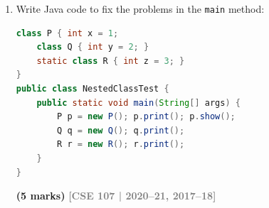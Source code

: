 \documentclass[12pt,a3paper]{article}
\newcommand{\yr}[1]{\hfill\textcolor{gray}{\small\textbf{[#1]}}}
\newcommand{\mk}[1]{\textcolor{orange!70!black}{\small\textbf{(#1 marks)}}}
\begin{document}
\begin{enumerate}
\begin{tcolorbox}[enhanced,breakable,ansbox,
  colback=cC!4,colframe=cC,boxrule=0.8pt,arc=5pt,
  title={\textbf{Answer --- Institute/College: equals and hashCode}},
  fonttitle=\bfseries\color{white},colbacktitle=cC]
\begin{lstlisting}[language=Java]
class College extends Institute {
    private int dept;
    private int batch;
    private int section;

    College(int id, int dept, int batch, int section) {
        super(id);
        this.dept    = dept;
        this.batch   = batch;
        this.section = section;
    }

    @Override
    public boolean equals(Object obj) {
        if (this == obj) return true;
        if (!(obj instanceof College)) return false;
        College o = (College) obj;
        return super.equals(o)
            && this.dept    == o.dept
            && this.batch   == o.batch
            && this.section == o.section;
    }

    @Override
    public int hashCode() {
        return Objects.hash(id, dept, batch, section);
    }
}

class CollegeDemo {
    public static void main(String[] args) {
        College c1 = new College(135790, 1, 1, 0);
        College c2 = new College(135790, 1, 1, 0);

        System.out.println(c1.equals(c2)); // true

        HashMap map = new HashMap();
        map.put(c1, 100);
        System.out.println(map.get(c2));   // 100
    }
}
\end{lstlisting}
\end{tcolorbox}

\item Write Java code to fix the problems in the \texttt{main} method:
\begin{lstlisting}[language=Java]
class P { int x = 1;
    class Q { int y = 2; }
    static class R { int z = 3; }
}
public class NestedClassTest {
    public static void main(String[] args) {
        P p = new P(); p.print(); p.show();
        Q q = new Q(); q.print();
        R r = new R(); r.print();
    }
}
\end{lstlisting}
\mk{5}
\yr{CSE 107 | 2020--21, 2017--18}

\begin{tcolorbox}[enhanced,breakable,ansbox,
  colback=cC!4,colframe=cC,boxrule=0.8pt,arc=5pt,
  title={\textbf{Answer --- Fixing Nested Class main() Problems}},
  fonttitle=\bfseries\color{white},colbacktitle=cC]


\end{tcolorbox}
\end{enumerate}
\end{document}
